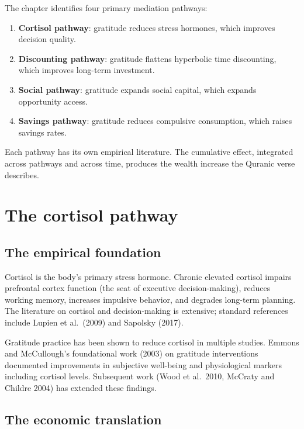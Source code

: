 The chapter identifies four primary mediation pathways:

\begin{enumerate}[leftmargin=2em]
    \item \textbf{Cortisol pathway}: gratitude reduces stress
    hormones, which improves decision quality.
    \item \textbf{Discounting pathway}: gratitude flattens
    hyperbolic time discounting, which improves long-term
    investment.
    \item \textbf{Social pathway}: gratitude expands social capital,
    which expands opportunity access.
    \item \textbf{Savings pathway}: gratitude reduces compulsive
    consumption, which raises savings rates.
\end{enumerate}

Each pathway has its own empirical literature. The cumulative
effect, integrated across pathways and across time, produces the
wealth increase the Quranic verse describes.

\section{The cortisol pathway}
\label{sec:grat-cortisol}

\subsection{The empirical foundation}

Cortisol is the body's primary stress hormone. Chronic elevated
cortisol impairs prefrontal cortex function (the seat of executive
decision-making), reduces working memory, increases impulsive
behavior, and degrades long-term planning. The literature on
cortisol and decision-making is extensive; standard references
include Lupien et al.\ (2009) and Sapolsky (2017).

Gratitude practice has been shown to reduce cortisol in multiple
studies. Emmons and McCullough's foundational work (2003) on
gratitude interventions documented improvements in subjective
well-being and physiological markers including cortisol levels.
Subsequent work (Wood et al.\ 2010, McCraty and Childre 2004) has
extended these findings.

\subsection{The economic translation}

